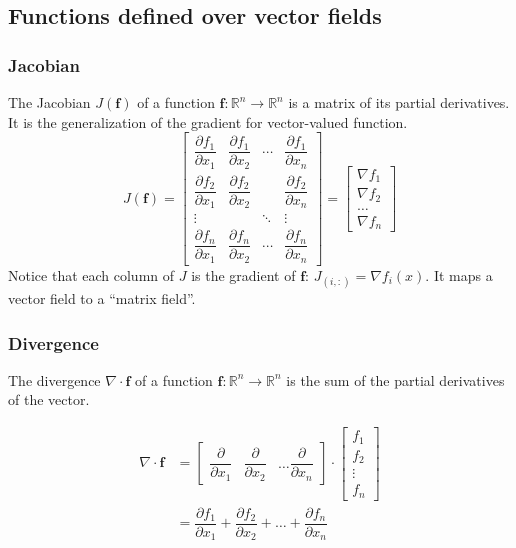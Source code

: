 \documentclass{article}
\begin{document}
\subsection{Functions defined over vector fields}

\subsubsection{Jacobian}
The Jacobian $J(\mathbf{f})$ of a function $ \mathbf{f}: \mathbb{R}^n \longrightarrow \mathbb{R}^n $
is a matrix of its partial derivatives. It is the generalization of the gradient
for vector-valued function.
\[
    J(\mathbf{f})=
    \begin{bmatrix}
        \dfrac{\partial f_1}{\partial x_1} &
        \dfrac{\partial f_1}{\partial x_2} &
        \cdots &
        \dfrac{\partial f_1}{\partial x_n} \\ 
        \dfrac{\partial f_2}{\partial x_1} &
        \dfrac{\partial f_2}{\partial x_2} &   &
        \dfrac{\partial f_2}{\partial x_n} \\ 
        \vdots &  & \ddots & \vdots \\ 
        \dfrac{\partial f_n}{\partial x_1} &
        \dfrac{\partial f_n}{\partial x_2} &
        \cdots &
        \dfrac{\partial f_n}{\partial x_n}
    \end{bmatrix} = 
    \begin{bmatrix}
        \nabla f_1 \\ \nabla f_2 \\ \hdots \\ \nabla f_n
    \end{bmatrix} 
\]
Notice that each column of $J$ is the gradient of $\mathbf{f}$: $J_{(i, :)} = \nabla
f_i(x)$. It maps a vector field to a ``matrix field''.
\subsubsection{Divergence}
The divergence $\nabla \cdot \mathbf{f}$ of a function $ \mathbf{f}: \mathbb{R}^n \longrightarrow
\mathbb{R}^n $ is the sum of the partial derivatives of the vector.

\begin{align*}
\nabla \cdot \mathbf{f}  &=
\begin{bmatrix}
        \dfrac{\partial }{\partial x_1} & 
        \dfrac{\partial }{\partial x_2} &
        \hdots
        \dfrac{\partial }{\partial x_n}
    \end{bmatrix} \cdot
    \begin{bmatrix}
        f_1 \\
        f_2 \\
        \vdots \\
        f_n
    \end{bmatrix} \\ &=  
    \dfrac{\partial f_1}{\partial x_1} + 
    \dfrac{\partial f_2}{\partial x_2} + 
    \hdots +
    \dfrac{\partial f_n}{\partial x_n}
\end{align*}
\end{document}
